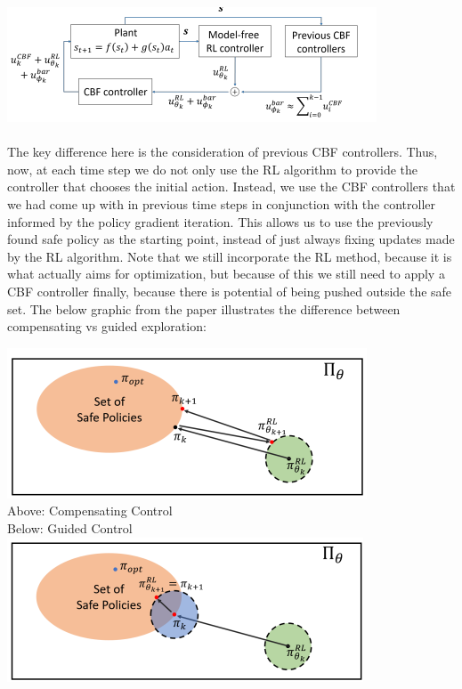 \documentclass{article}
\begin{document}
\includegraphics[scale = 1.5]{Screenshot 2023-05-13 180227.png}\\\\
The key difference here is the consideration of previous CBF controllers. Thus, now, at each time step we do not only use the RL algorithm to provide the controller that chooses the initial action. Instead, we use the CBF controllers that we had come up with in previous time steps in conjunction with the controller informed by the policy gradient iteration. This allows us to use the previously found safe policy as the starting point, instead of just always fixing updates made by the RL algorithm. Note that we still incorporate the RL method, because it is what actually aims for optimization, but because of this we still need to apply a CBF controller finally, because there is potential of being pushed outside the safe set. The below graphic from the paper illustrates the difference between compensating vs guided exploration:
\begin{center}
    \includegraphics[scale = 1.1]{Screenshot 2023-05-13 184059.png} \\ 
    Above: Compensating Control\\
    Below: Guided Control\\ 
    \includegraphics[scale = 1.1]{Screenshot 2023-05-13 184109.png} \\
\end{center}
\end{document}
